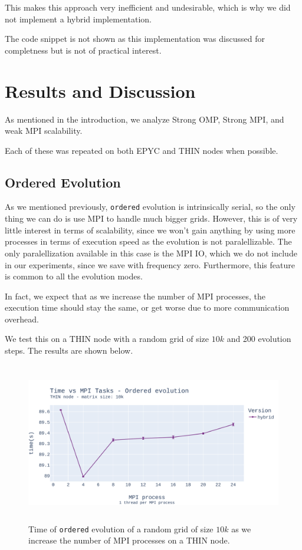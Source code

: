 \documentclass{report}
\begin{document}
This makes this approach very inefficient and undesirable, which is why we did not 
implement a hybrid implementation. 

The code snippet is not shown as this implementation was discussed for completness 
but is not of practical interest.

\section{Results and Discussion}

As mentioned in the introduction, we analyze Strong OMP, Strong MPI, and weak MPI 
scalability.

Each of these was repeated on both EPYC and THIN nodes when possible. 

\subsection{Ordered Evolution}

As we mentioned previously, \texttt{ordered} evolution is intrinsically serial,
so the only thing we can do is use MPI to handle much bigger grids. However, 
this is of very little interest in terms of scalability, since we won't gain 
anything by using more processes in terms of execution speed as the evolution 
is not paralellizable. The only paralellization available in this case is the 
MPI IO, which we do not include in our experiments, since we save with frequency 
zero. Furthermore, this feature is common to all the evolution modes.

In fact, we expect that as we increase the number of MPI processes, the execution 
time should stay the same, or get worse due to more communication overhead. 

We test this on a THIN node with a random grid of size $10k$ and 200 evolution 
steps. The results are shown below.

\begin{figure}[H]
\centering
\includegraphics[width=14cm, height=7cm]{./images/strong_MPI_ordered.pdf}
\caption{\label{fig:strongomp10kspeedupthin} Time of \texttt{ordered} evolution of a random grid 
of size $10k$ as we increase the number of MPI processes on a THIN node.}
\end{figure}
\end{document}
